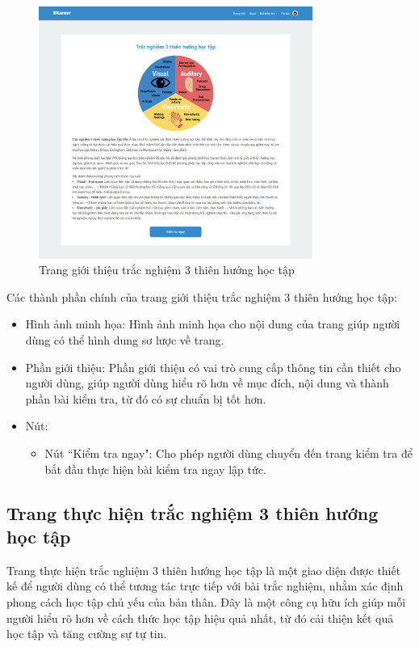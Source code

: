 \begin{figure}[H]
    \centering
    \includegraphics[width=0.8\textwidth]
    {images/chap5/learningStyleDetail.png}
    \vspace{0.5cm}
    \caption{Trang giới thiệu trắc nghiệm 3 thiên hướng học tập}
\end{figure}

Các thành phần chính của trang giới thiệu trắc nghiệm 3 thiên hướng học tập:
\begin{itemize}
    \item Hình ảnh minh họa: Hình ảnh minh họa cho nội dung của trang giúp người dùng có thể hình dung sơ lược về trang.
    \item Phần giới thiệu: Phần giới thiệu có vai trò cung cấp thông tin cần thiết cho người dùng, giúp người dùng hiểu rõ hơn về mục đích, nội dung và thành phần bài kiểm tra, từ đó có sự chuẩn bị tốt hơn.
    \item Nút:
        \begin{itemize}
            \item Nút ``Kiểm tra ngay": Cho phép người dùng chuyển đến trang kiểm tra để bắt đầu thực hiện bài kiểm tra ngay lập tức.
        \end{itemize}
\end{itemize}


\subsection{Trang thực hiện trắc nghiệm 3 thiên hướng học tập}
Trang thực hiện trắc nghiệm 3 thiên hướng học tập là một giao diện được thiết kế để người dùng có thể tương tác trực tiếp với bài trắc nghiệm, nhằm xác định phong cách học tập chủ yếu của bản thân. Đây là một công cụ hữu ích giúp mỗi người hiểu rõ hơn về cách thức học tập hiệu quả nhất, từ đó cải thiện kết quả học tập và tăng cường sự tự tin.

